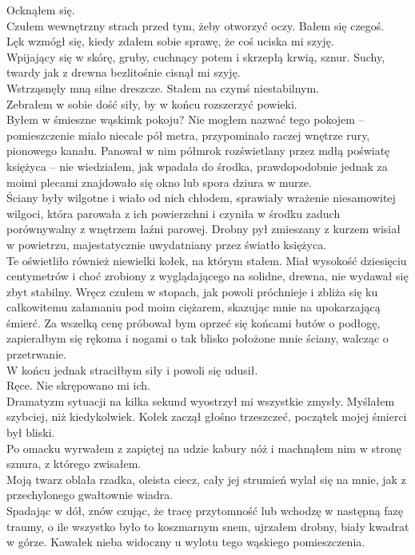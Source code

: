 \documentclass[../MAIN.tex]{subfiles}
\begin{document}
Ocknąłem się.\\
Czułem wewnętrzny strach przed tym, żeby otworzyć oczy. Bałem się czegoś.\\
Lęk wzmógł się, kiedy zdałem sobie sprawę, że coś uciska mi szyję.\\
Wpijający się w skórę, gruby, cuchnący potem i skrzepłą krwią, sznur. Suchy, twardy jak z drewna bezlitośnie cisnął mi szyję.\\
Wstrząsnęły mną silne dreszcze. Stałem na czymś niestabilnym.\\
Zebrałem w sobie dość siły, by w końcu rozszerzyć powieki.\\
Byłem w śmieszne wąskim\3k pokoju? Nie mogłem nazwać tego pokojem -- pomieszczenie miało niecałe pół metra, przypominało raczej wnętrze rury, pionowego kanału. Panował w nim półmrok rozświetlany przez mdłą poświatę księżyca -- nie wiedziałem, jak wpadała do środka, prawdopodobnie jednak za moimi plecami znajdowało się okno lub spora dziura w murze.\\
Ściany były wilgotne i wiało od nich chłodem, sprawiały wrażenie niesamowitej wilgoci, która parowała z ich powierzchni i czyniła w środku zaduch porównywalny z wnętrzem łaźni parowej. Drobny pył zmieszany z kurzem wisiał w powietrzu, majestatycznie uwydatniany przez światło księżyca.\\
Te oświetliło również niewielki kołek, na którym stałem. Miał wysokość dziesięciu centymetrów i choć zrobiony z wyglądającego na solidne, drewna, nie wydawał się zbyt stabilny. Wręcz czułem w stopach, jak powoli próchnieje i zbliża się ku całkowitemu załamaniu pod moim ciężarem, skazując mnie na upokarzającą śmierć. Za wszelką cenę próbował bym oprzeć się końcami butów o podłogę, zapierałbym się rękoma i nogami o tak blisko położone mnie ściany, walcząc o przetrwanie.\\
W końcu jednak straciłbym siły i powoli się udusił.\\
Ręce. Nie skrępowano mi ich.\\
Dramatyzm sytuacji na kilka sekund wyostrzył mi wszystkie zmysły. Myślałem szybciej, niż kiedykolwiek. Kołek zaczął głośno trzeszczeć, początek mojej śmierci był bliski.\\
Po omacku wyrwałem z zapiętej na udzie kabury nóż i machnąłem nim w stronę sznura, z którego zwisałem.\\
Moją twarz oblała rzadka, oleista ciecz, cały jej strumień wylał się na mnie, jak z przechylonego gwałtownie wiadra.\\
Spadając w dół, znów czując, że tracę przytomność lub wchodzę w następną fazę traumy, o ile wszystko było to koszmarnym snem, ujrzałem drobny, biały kwadrat w górze. Kawałek nieba widoczny u wylotu tego wąskiego pomieszczenia.\\
\end{document}
